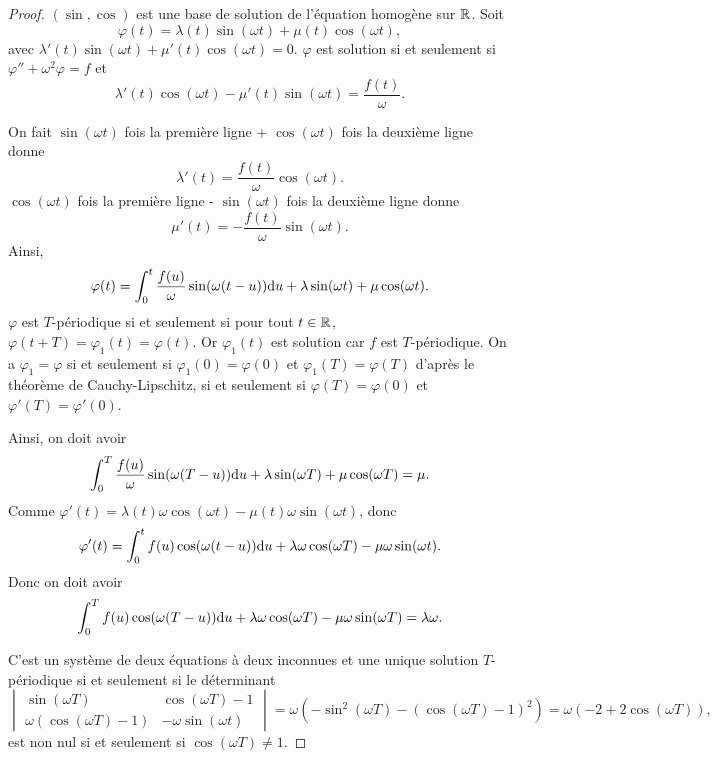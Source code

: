 \documentclass[12pt]{article}
\begin{document}
\begin{proof}
	$(\sin,\cos)$ est une base de solution de l'équation homogène sur $\mathbb{R}$. Soit 
	\begin{equation}
		\varphi(t)=\lambda(t)\sin(\omega t)+\mu(t)\cos(\omega t),
	\end{equation}
	avec $\lambda'(t)\sin(\omega t)+\mu'(t)\cos(\omega t)=0$. $\varphi$ est solution si et seulement si $\varphi''+\omega^{2}\varphi=f$ et 
	\begin{equation}
		\lambda'(t)\cos(\omega t)-\mu'(t)\sin(\omega t)=\frac{f(t)}{\omega}.
	\end{equation}

	On fait $\sin(\omega t)$ fois la première ligne + $\cos(\omega t)$ fois la deuxième ligne donne 
	\begin{equation}
		\lambda'(t)=\frac{f(t)}{\omega}\cos(\omega t).
	\end{equation}
	$\cos(\omega t)$ fois la première ligne - $\sin(\omega t)$ fois la deuxième ligne donne 
	\begin{equation}
		\mu'(t)=-\frac{f(t)}{\omega}\sin(\omega t).
	\end{equation}
	Ainsi,
	\begin{equation}
		\varphi(t)=\int_{0}^{t}\frac{f(u)}{\omega}\sin(\omega(t-u))\mathrm{d} u+\lambda\sin(\omega t)+\mu\cos(\omega t).
	\end{equation}
	$\varphi$ est $T$-périodique si et seulement si pour tout $t\in\mathbb{R}$, $\varphi(t+T)=\varphi_1(t)=\varphi(t)$. Or $\varphi_1(t)$ est solution car $f$ est $T$-périodique. On a $\varphi_1=\varphi$ si et seulement si $\varphi_1(0)=\varphi(0)$ et $\varphi_1(T)=\varphi(T)$ d'après le théorème de Cauchy-Lipschitz, si et seulement si $\varphi(T)=\varphi(0)$ et $\varphi'(T)=\varphi'(0)$.

	Ainsi, on doit avoir 
	\begin{equation}
		\int_{0}^{T}\frac{f(u)}{\omega}\sin(\omega(T-u))\mathrm{d} u+\lambda\sin(\omega T)+\mu\cos(\omega T)=\mu.
	\end{equation}
	Comme $\varphi'(t)=\lambda(t)\omega\cos(\omega t)-\mu(t)\omega\sin(\omega t)$, donc 
	\begin{equation}
		\varphi'(t)=\int_{0}^{t}f(u)\cos(\omega(t-u))\mathrm{d} u+\lambda\omega\cos(\omega T)-\mu\omega\sin(\omega t).
	\end{equation}
	Donc on doit avoir 
	\begin{equation}
		\int_{0}^{T}f(u)\cos(\omega(T-u))\mathrm{d} u+\lambda\omega\cos(\omega T)-\mu\omega\sin(\omega T)=\lambda\omega.
	\end{equation}

	C'est un système de deux équations à deux inconnues et une unique solution $T$-périodique si et seulement si le déterminant 
	\begin{equation}
		\begin{vmatrix}
			\sin(\omega T)&\cos(\omega T)-1\\
			\omega(\cos(\omega T)-1)& -\omega\sin(\omega t)
		\end{vmatrix}=\omega\left(-\sin^{2}(\omega T)-\left(\cos(\omega T)-1\right)^{2}\right)=\omega\left(-2+2\cos(\omega T)\right),
	\end{equation}
	est non nul si et seulement si $\cos(\omega T)\neq1$.
\end{proof}
\end{document}
